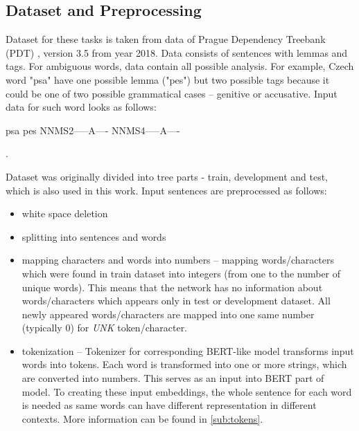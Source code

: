 
\subsection{Dataset and Preprocessing}
\label{sub:dataset}
Dataset for these tasks is taken from data of Prague Dependency Treebank (PDT) \citep{PDT35}, version 3.5 from year 2018. %
Data consists of sentences with lemmas and tags. For ambiguous words, data contain all possible analysis. For example, Czech word "psa" have one possible lemma ("pes") but two possible tags because it could be one of two possible grammatical cases -- genitive or accusative. Input data for such word looks as follows: \\
\begin{center}
psa pes NNMS2-----A---- NNMS4-----A----
\end{center}.

Dataset was originally divided into tree parts - train, development and test, which is also used in this work. Input sentences are preprocessed as follows: %
\begin{itemize}
\item white space deletion
\item splitting into sentences and words
\item mapping characters and words into numbers -- mapping  words/characters which were found in train dataset into integers (from one to the number of unique words). This means that the network has no information about words/characters which appears only in test or development dataset. All newly appeared words/characters are mapped into one same number (typically $0$) for \textit{UNK} token/character.
\item tokenization -- Tokenizer for corresponding BERT-like model transforms input words into tokens. Each word is transformed into one or more strings, which are converted into numbers. This serves as an input into BERT part of model. To creating these input embeddings, the whole sentence for each word is needed as same words can have different representation in different contexts. More information can be found in \ref{sub:tokens}.
\end{itemize}

